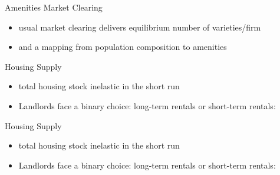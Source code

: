 \begin{frame}{Amenities Market Clearing}
    \begin{itemize}
         \item usual market clearing delivers equilibrium number of varieties/firm
         \item and a mapping from population composition to amenities
    \end{itemize}
 \end{frame}

\begin{frame}{Housing Supply}
    \begin{itemize}
         \item total housing stock inelastic in the short run
         \item Landlords face a binary choice: long-term rentals or short-term rentals:
         \begin{figure}
            \centering
            \caption{}
            \label{fig:photo}
        \end{figure}
    \end{itemize}
 \end{frame}

\begin{frame}{Housing Supply}
    \begin{itemize}
         \item total housing stock inelastic in the short run
         \item Landlords face a binary choice: long-term rentals or short-term rentals:
         \begin{figure}
            \centering
            \caption{}
            \label{fig:photo}
        \end{figure}
    \end{itemize}
 \end{frame}

